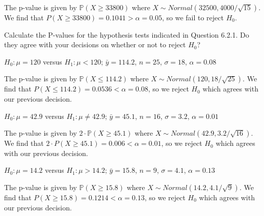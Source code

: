 \documentclass{article}
\renewcommand{\P}{\mathbb{P}}
\begin{document}
\begin{probset}
\begin{prob}[\textbf{6.2.4}]
    \begin{soln}
        The p-value is given by $\P(X \geq 33800)$ where $X \sim Normal(32500, 4000/\sqrt{15})$. We find that $P(X \geq 33800) = 0.1041 > \alpha = 0.05$, so we fail to reject $H_0$.
    \end{soln}
\end{prob}

\newpage

\begin{prob}[\textbf{6.2.8}]
    Calculate the P-values for the hypothesis tests indicated in Question 6.2.1. Do they agree with your decisions on whether or not to reject $H_0$?

    \begin{subprobset}
    \begin{subprob}
        $H_0: \mu = 120$ versus $H_1: \mu < 120$; $\bar{y} = 114.2$, $n = 25$, $\sigma = 18$, $\alpha = 0.08$

        \begin{soln}
            The p-value is given by $\P(X \leq 114.2)$ where $X \sim Normal(120, 18/\sqrt{25})$. We find that $P(X \leq 114.2) = 0.0536 < \alpha = 0.08$, so we reject $H_0$ which agrees with our previous decision.
        \end{soln}
    \end{subprob}

    \begin{subprob}
        $H_0: \mu = 42.9$ versus $H_1: \mu \neq 42.9$; $\bar{y} = 45.1$, $n = 16$, $\sigma = 3.2$, $\alpha = 0.01$

        \begin{soln}
            The p-value is given by $2 \cdot \P(X \geq 45.1)$ where $X \sim Normal(42.9, 3.2/\sqrt{16})$. We find that $2 \cdot P(X \geq 45.1) = 0.006 < \alpha = 0.01$, so we reject $H_0$ which agrees with our previous decision.
        \end{soln}
    \end{subprob}

    \begin{subprob}
        $H_0: \mu = 14.2$ versus $H_1: \mu > 14.2$; $\bar{y} = 15.8$, $n = 9$, $\sigma = 4.1$, $\alpha = 0.13$

        \begin{soln}
            The p-value is given by $\P(X \geq 15.8)$ where $X \sim Normal(14.2, 4.1/\sqrt{9})$. We find that $P(X \geq 15.8) = 0.1214 < \alpha = 0.13$, so we reject $H_0$ which agrees with our previous decision.
        \end{soln}
    \end{subprob}
    \end{subprobset}
\end{prob}


\end{probset}
\end{document}
